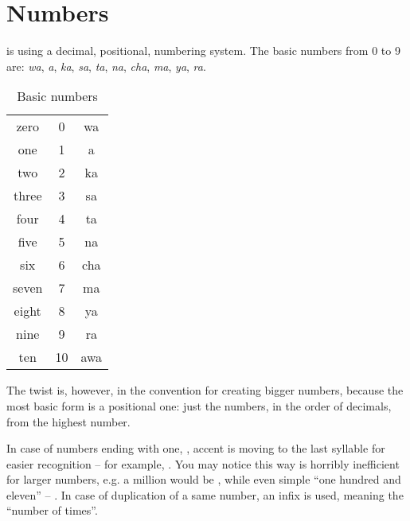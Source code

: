 

\section{Numbers}
\label{sec:morph-numbers}

\andro is using a decimal, positional, numbering system. The basic numbers from
0 to 9 are: \emph{wa}, \emph{a}, \emph{ka}, \emph{sa}, \emph{ta}, \emph{na},
\emph{cha}, \emph{ma}, \emph{ya}, \emph{ra}.

\begin{table}[ht]
    \centering
    \caption{Basic numbers}
    \begin{tabular}{ccc} \toprule
        zero  & 0  & wa  \\
        one   & 1  & a   \\
        two   & 2  & ka  \\
        three & 3  & sa  \\
        four  & 4  & ta  \\
        five  & 5  & na  \\
        six   & 6  & cha \\
        seven & 7  & ma  \\
        eight & 8  & ya  \\
        nine  & 9  & ra  \\
        ten   & 10 & awa \\\bottomrule
    \end{tabular}
    \label{tab:numerals}
\end{table}

The twist is, however, in the convention for creating bigger numbers, because
the most basic form is a positional one: just the numbers, in the order of
decimals, from the highest number.




In case of numbers ending with one, , accent is moving to the last
syllable for easier recognition -- for example, . You may notice
this way is horribly inefficient for larger numbers, e.g. a million would be
, while even simple ``one hundred and eleven'' --
. In case of duplication of a same number, an  infix is
used, meaning the ``number of times''.

